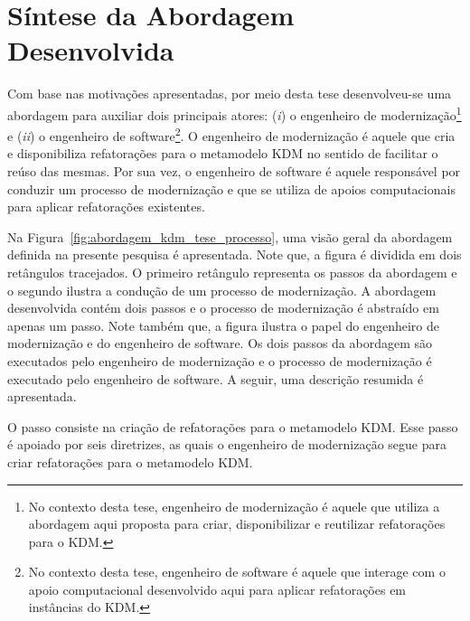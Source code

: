 

\section{Síntese da Abordagem Desenvolvida}\label{sec:introducao:a_abordagem_desenvolvida}

Com base nas motivações apresentadas, por meio desta tese desenvolveu-se uma abordagem para auxiliar dois principais atores: (\textit{i}) o engenheiro de modernização\footnote{No contexto desta tese, engenheiro de modernização é aquele que utiliza a abordagem aqui proposta para criar, disponibilizar e reutilizar refatorações para o KDM.} e  (\textit{ii}) o engenheiro de software\footnote{No contexto desta tese, engenheiro de software é aquele que interage com o apoio computacional desenvolvido aqui para aplicar refatorações em instâncias do KDM.}. O engenheiro de modernização é aquele que cria e disponibiliza refatorações para o metamodelo KDM no sentido de facilitar o reúso das mesmas. Por sua vez, o engenheiro de software é aquele responsável por conduzir um processo de modernização e que se utiliza de apoios computacionais para aplicar refatorações existentes.





Na Figura~\ref{fig:abordagem_kdm_tese_processo}, uma visão geral da abordagem definida na presente pesquisa é apresentada. Note que, a figura é dividida em dois retângulos tracejados. O primeiro retângulo representa os passos da abordagem e o segundo ilustra a condução de um processo de modernização. A abordagem desenvolvida contém dois passos e o processo de modernização é abstraído em apenas um passo. Note também que, a figura ilustra o papel do engenheiro de modernização e do engenheiro de software. 
Os dois passos da abordagem são executados pelo engenheiro de modernização e o processo de modernização é executado pelo engenheiro de software. A seguir, uma descrição resumida é apresentada.

O passo  consiste na criação de refatorações para o metamodelo KDM. Esse passo é apoiado por seis diretrizes, as quais o engenheiro de modernização segue para criar refatorações para o metamodelo KDM.%


